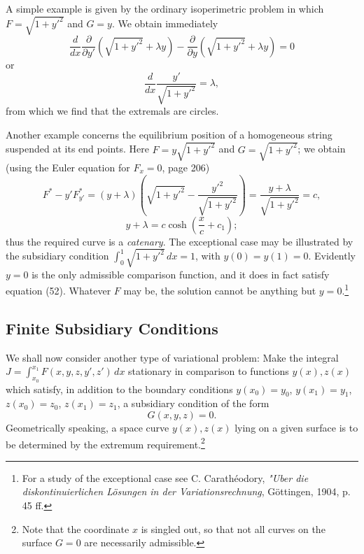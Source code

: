 A simple example is given by the ordinary isoperimetric problem in which $F=\sqrt{1+y'^2}$ and $G=y$. We obtain immediately
\[
\frac{d}{dx}\frac{\partial}{\partial y'}(\sqrt{1+y'^2}+\lambda y)-
\frac{\partial}{\partial y}(\sqrt{1+y'^2}+\lambda y)=0
\]
or
\[
\frac{d}{dx}\frac{y'}{\sqrt{1+y'^2}}=\lambda,
\]
from which we find that the extremals are circles.

Another example concerns the equilibrium position of a homogeneous string suspended at its end points. Here $F=y\sqrt{1+y'^2}$ and $G=\sqrt{1+y'^2}$; we obtain (using the Euler equation for $F_x=0$, page 206)
\[
F^*-y'F^*_{y'}=(y+\lambda)\left(\sqrt{1+y'^2}-\frac{y'^2}{\sqrt{1+y'^2}}\right)
=\frac{y+\lambda}{\sqrt{1+y'^2}}=c,
\]
\[
y+\lambda=c\cosh\left(\frac{x}{c}+c_1\right);
\]
thus the required curve is a \emph{catenary}. The exceptional case may be illustrated by the subsidiary condition $\int_0^1\sqrt{1+y'^2}\,dx=1$, with $y(0)=y(1)=0$. Evidently $y=0$ is the only admissible comparison function, and it does in fact satisfy equation (52). Whatever $F$ may be, the solution cannot be anything but $y=0$.\footnote{For a study of the exceptional case see C. Carath\'eodory, \emph{"Uber die diskontinuierlichen L\"osungen in der Variationsrechnung}, G\"ottingen, 1904, p. 45 ff.}

\subsection{Finite Subsidiary Conditions}
We shall now consider another type of variational problem: Make the integral $J=\int_{x_0}^{x_1}F(x,y,z,y',z')\,dx$ stationary in comparison to functions $y(x),z(x)$ which satisfy, in addition to the boundary conditions $y(x_0)=y_0$, $y(x_1)=y_1$, $z(x_0)=z_0$, $z(x_1)=z_1$, a subsidiary condition of the form
\begin{equation}\tag{54}
G(x,y,z)=0.
\end{equation}
Geometrically speaking, a space curve $y(x),z(x)$ lying on a given surface is to be determined by the extremum requirement.\footnote{Note that the coordinate $x$ is singled out, so that not all curves on the surface $G=0$ are necessarily admissible.}

